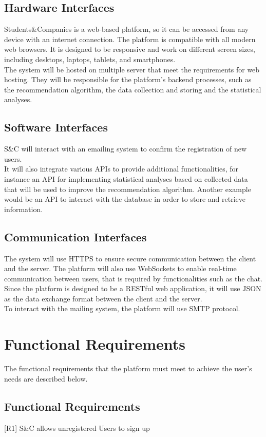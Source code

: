 \subsection{Hardware Interfaces}
Students\&Companies is a web-based platform, so it can be accessed from any device with an internet connection. The platform is
compatible with all modern web browsers. It is designed to be responsive and work on different screen sizes, including desktops, 
laptops, tablets, and smartphones. \\
The system will be hosted on multiple server that meet the requirements for web hosting. They will be responsible for the platform's 
backend processes, such as the recommendation algorithm, the data collection and storing and the statistical analyses.


\subsection{Software Interfaces}
S\&C will interact with an emailing system to confirm the registration of new users. \\
It will also integrate various APIs to provide additional functionalities, for instance an API for implementing statistical analyses 
based on collected data that will be used to improve the recommendation algorithm. Another example would be an API to interact with
the database in order to store and retrieve information.


\subsection{Communication Interfaces}
The system will use HTTPS to ensure secure communication between the client and the server. The platform will also use WebSockets to
enable real-time communication between users, that is required by functionalities such as the chat. Since the platform is designed to be a 
RESTful web application, it will use JSON as the data exchange format between the client and the server. \\
To interact with the mailing system, the platform will use SMTP protocol.


\section{Functional Requirements}
The functional requirements that the platform must meet to achieve the user's needs are described below.
\subsection{Functional Requirements}
[R1] S\&C allows unregistered Users to sign up

